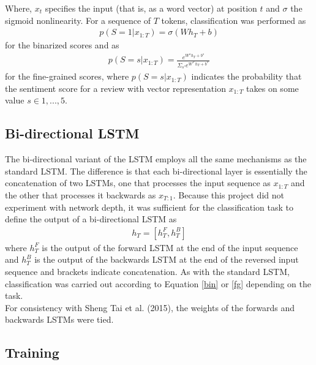 \documentclass[a4paper]{article}
\begin{document}
Where, $x_t$ specifies the input (that is, as a word vector) at position $t$ and $\sigma$ the sigmoid nonlinearity. For a sequence of $T$ tokens, classification was performed as
\begin{align}
\label{bin}p(S=1 | x_{1:T}) = \sigma(W h_T + b)
\end{align}
for the binarized scores and as
\begin{align}
\label{fg}p(S=s | x_{1:T}) = \frac{e^{W^s h_T + b^s}}{\Sigma_{s'}e^{W^{s'} h_T + b^{s'}}}
\end{align}
for the fine-grained scores, where $p(S=s | x_{1:T})$ indicates the probability that the sentiment score for a review with vector representation $x_{1:T}$ takes on some value $s \in {1, ..., 5}$.

\subsection{Bi-directional LSTM}

The bi-directional variant of the LSTM employs all the same mechanisms as the standard LSTM. The difference is that each bi-directional layer is essentially the concatenation of two LSTMs, one that processes the input sequence as $x_{1:T}$ and the other that processes it backwards as $x_{T:1}$.
Because this project did not experiment with network depth, it was sufficient for the classification task to define the output of a bi-directional LSTM as
\begin{align*}
h_T = [h^{F}_T, h^{B}_T]
\end{align*}
where $h^{F}_T$ is the output of the forward LSTM at the end of the input sequence and $h^{B}_T$ is the output of the backwards LSTM at the end of the reversed input sequence and brackets indicate concatenation. As with the standard LSTM, classification was carried out according to Equation \ref{bin} or \ref{fg} depending on the task.\\
For consistency with Sheng Tai et al. (2015), the weights of the forwards and backwards LSTMs were tied.

\subsection{Training}
\end{document}
